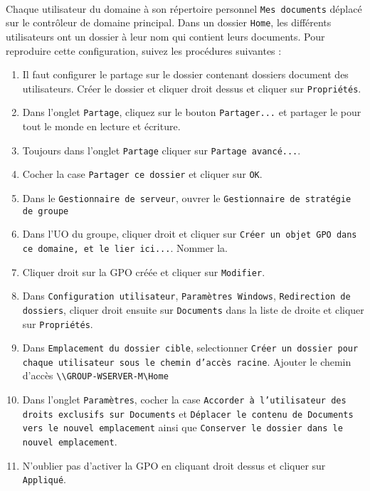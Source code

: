 			\paragraph{}
				Chaque utilisateur du domaine à son répertoire personnel \texttt{Mes documents} déplacé sur le contrôleur de domaine principal. Dans un dossier \texttt{Home}, les différents utilisateurs ont un dossier à leur nom qui contient leurs documents. Pour reproduire cette configuration, suivez les procédures suivantes :
				\begin{enumerate}
					\item Il faut configurer le partage sur le dossier contenant dossiers document des utilisateurs. Créer le dossier et cliquer droit dessus et cliquer sur \texttt{Propriétés}.
					\item Dans l'onglet \texttt{Partage}, cliquez sur le bouton \texttt{Partager...} et partager le pour tout le monde en lecture et écriture.
					\item Toujours dans l'onglet \texttt{Partage} cliquer sur \texttt{Partage avancé...}.
					\item Cocher la case \texttt{Partager ce dossier} et cliquer sur \texttt{OK}.
					\item Dans le \texttt{Gestionnaire de serveur}, ouvrer le \texttt{Gestionnaire de stratégie de groupe}
					\item Dans l'UO du groupe, cliquer droit et cliquer sur \texttt{Créer un objet GPO dans ce domaine, et le lier ici...}. Nommer la. 
					\item Cliquer droit sur la GPO créée et cliquer sur \texttt{Modifier}.
					\item Dans \texttt{Configuration utilisateur}, \texttt{Paramètres Windows}, \texttt{Redirection de dossiers}, cliquer droit ensuite sur \texttt{Documents} dans la liste de droite et cliquer sur \texttt{Propriétés}. 
					\item Dans \texttt{Emplacement du dossier cible}, selectionner \texttt{Créer un dossier pour chaque utilisateur sous le chemin d'accès racine}. Ajouter le chemin d'accès \texttt{\textbackslash{}\textbackslash{}GROUP-WSERVER-M\textbackslash{}Home}
					\item Dans l'onglet \texttt{Paramètres}, cocher la case \texttt{Accorder à l'utilisateur des droits exclusifs sur Documents} et \texttt{Déplacer le contenu de Documents vers le nouvel emplacement} ainsi que \texttt{Conserver le dossier dans le nouvel emplacement}.
					\item N'oublier pas d'activer la GPO en cliquant droit dessus et cliquer sur \texttt{Appliqué}.
				\end{enumerate}

